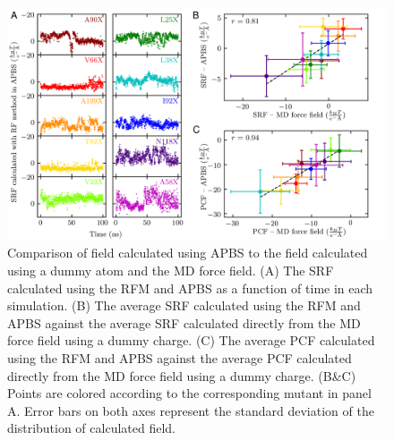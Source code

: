 \begin{figure}
    \center
    \includegraphics[width=\double]{figures-snase/combined_APBS_figure.png}
    \caption[Comparison of field calculated using APBS to the field calculated using the MD force field]{
        Comparison of field calculated using APBS to the field calculated using a dummy atom and the MD force field. 
        (A) The SRF calculated using the RFM and APBS as a function of time in each simulation. 
        (B) The average SRF calculated using the RFM and APBS against the average SRF calculated directly from the MD force field using a dummy charge. 
        (C) The average PCF calculated using the RFM and APBS against the average PCF calculated directly from the MD force field using a dummy charge. 
        (B\&C) Points are colored according to the corresponding mutant in panel A. 
        Error bars on both axes represent the standard deviation of the distribution of calculated field.
    }
    \label{fig:snase-apbs}
\end{figure}

